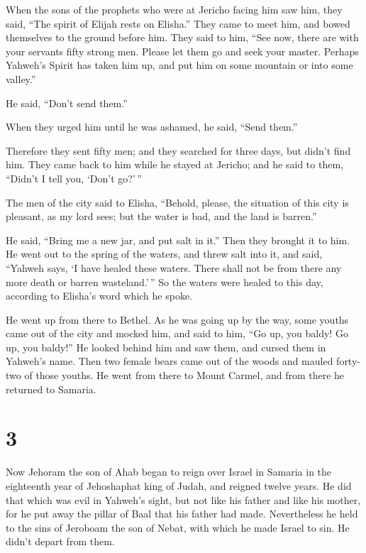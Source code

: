  When the sons of the prophets who were at Jericho facing
him saw him, they said, ``The spirit of Elijah rests on Elisha.'' They
came to meet him, and bowed themselves to the ground before him.
 They said to him, ``See now, there are with your
servants fifty strong men. Please let them go and seek your master.
Perhaps Yahweh's Spirit has taken him up, and put him on some mountain
or into some valley.''

He said, ``Don't send them.''

 When they urged him until he was ashamed, he said,
``Send them.''

Therefore they sent fifty men; and they searched for three days, but
didn't find him.  They came back to him while he stayed
at Jericho; and he said to them, ``Didn't I tell you, `Don't go?'\,''

 The men of the city said to Elisha, ``Behold, please,
the situation of this city is pleasant, as my lord sees; but the water
is bad, and the land is barren.''

 He said, ``Bring me a new jar, and put salt in it.''
Then they brought it to him.  He went out to the spring
of the waters, and threw salt into it, and said, ``Yahweh says, `I have
healed these waters. There shall not be from there any more death or
barren wasteland.'\,''  So the waters were healed to this
day, according to Elisha's word which he spoke.

 He went up from there to Bethel. As he was going up by
the way, some youths came out of the city and mocked him, and said to
him, ``Go up, you baldy! Go up, you baldy!''  He looked
behind him and saw them, and cursed them in Yahweh's name. Then two
female bears came out of the woods and mauled forty-two of those youths.
 He went from there to Mount Carmel, and from there he
returned to Samaria.

\hypertarget{section-2}{%
\section{3}\label{section-2}}

 Now Jehoram the son of Ahab began to reign over Israel in
Samaria in the eighteenth year of Jehoshaphat king of Judah, and reigned
twelve years.  He did that which was evil in Yahweh's
sight, but not like his father and like his mother, for he put away the
pillar of Baal that his father had made.  Nevertheless he
held to the sins of Jeroboam the son of Nebat, with which he made Israel
to sin. He didn't depart from them.

